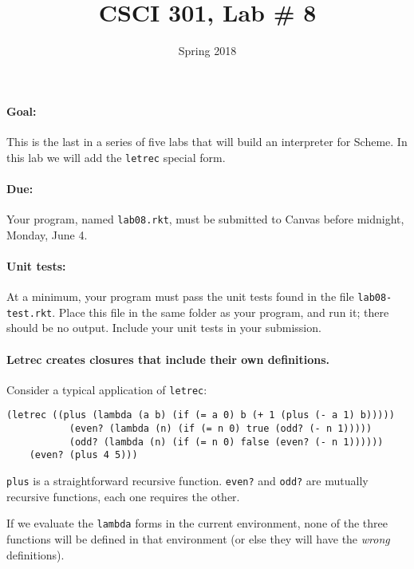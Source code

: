 \documentclass{article}
\title{CSCI 301, Lab \# 8}
\author{Spring 2018}
\date{}
\begin{document}
\maketitle


\paragraph{Goal:} This is the last in a series of five labs that will
build an interpreter for Scheme.  In this lab we will add the {\tt letrec}
special form.

\paragraph{Due:} Your program, named {\tt lab08.rkt}, must be submitted to
Canvas before midnight, Monday, June 4.

\paragraph{Unit tests:}
At a minimum, your program must pass the unit tests found in the
file {\tt lab08-test.rkt}.  Place this file in the same folder
as your program, and run it;  there should be no output.  Include
your unit tests in your submission.

\paragraph{Letrec creates closures that include their own definitions.}

Consider a typical application of {\tt letrec}:
\begin{Verbatim}[frame=single]
  (letrec ((plus (lambda (a b) (if (= a 0) b (+ 1 (plus (- a 1) b)))))
           (even? (lambda (n) (if (= n 0) true (odd? (- n 1)))))
           (odd? (lambda (n) (if (= n 0) false (even? (- n 1))))))
    (even? (plus 4 5)))
\end{Verbatim}
{\tt plus} is a straightforward recursive function.  {\tt even?} and
{\tt odd?} are mutually recursive functions, each one requires the
other.

If we evaluate the {\tt lambda} forms in  the current environment,
none of the three functions will be defined in that environment (or
else they will have the {\em wrong} definitions).
\end{document}
